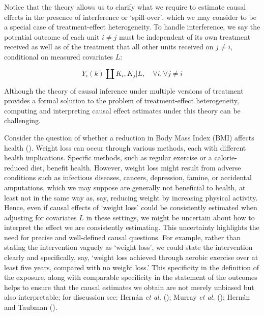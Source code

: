 \documentclass[
  singlecolumn]{article}
\begin{document}
Notice that the theory allows us to clarify what we require to estimate
causal effects in the presence of interference or `spill-over', which we
may consider to be a special case of treatment-effect heterogeneity. To
handle interference, we say the potential outcome of each unit
\(i \neq j\) must be independent of its own treatment received as well
as of the treatment that all other units received on \(j \neq i\),
conditional on measured covariates \(L\):

\[
    Y_i(k) \coprod K_i, K_j | L, \quad \forall i, \forall j \neq i
\]

Although the theory of causal inference under multiple versions of
treatment provides a formal solution to the problem of treatment-effect
heterogeneity, computing and interpreting causal effect estimates under
this theory can be challenging.

Consider the question of whether a reduction in Body Mass Index (BMI)
affects health ().
Weight loss can occur through various methods, each with different
health implications. Specific methods, such as regular exercise or a
calorie-reduced diet, benefit health. However, weight loss might result
from adverse conditions such as infectious diseases, cancers,
depression, famine, or accidental amputations, which we may suppose are
generally not beneficial to health, at least not in the same way as,
say, reducing weight by increasing physical activity. Hence, even if
causal effects of `weight loss' could be consistently estimated when
adjusting for covariates \(L\) in these settings, we might be uncertain
about how to interpret the effect we are consistently estimating. This
uncertainty highlights the need for precise and well-defined causal
questions. For example, rather than stating the intervention vaguely as
`weight loss', we could state the intervention clearly and specifically,
say, `weight loss achieved through aerobic exercise over at least five
years, compared with no weight loss.' This specificity in the definition
of the exposure, along with comparable specificity in the statement of
the outcomes helps to ensure that the causal estimates we obtain are not
merely unbiased but also interpretable; for discussion see: Hernán
\emph{et al.} (); Murray \emph{et al.}
(); Hernán and Taubman
().
\end{document}
